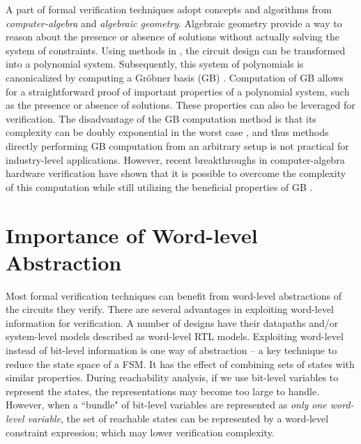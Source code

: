 A part of formal verification techniques adopt concepts and algorithms from 
\emph{computer-algebra} and \emph{algebraic geometry}.
Algebraic geometry provide a way to reason about the presence or absence of solutions 
without actually solving the system of constraints.
Using methods in \cite{Avrunin:CAV,condrat-tacas07,gbverify:2007,jinpeng,pruss:tcad15}, 
the circuit design can be transformed into a polynomial system. Subsequently, this system
of polynomials is canonicalized by computing a Gr\"obner basis (GB) \cite{gb_book}. 
Computation of GB allows for 
a straightforward proof of important properties of a polynomial system, 
such as the presence or absence of 
solutions. These properties can also be leveraged for 
verification. The disadvantage of the GB computation method is that its complexity can be doubly 
exponential in the worst case \cite{dube1986complexity}, and thus methods directly performing GB computation 
from an arbitrary setup is not practical for industry-level applications. However, recent
breakthroughs in computer-algebra hardware verification have shown
that it is possible to overcome the complexity of this computation while
still utilizing the beneficial properties of GB
\cite{lv:phd,tim:phd}.

\section{Importance of Word-level Abstraction}
Most formal verification techniques can benefit from word-level abstractions 
of the circuits they verify.
There are several advantages in exploiting word-level information for
verification. A number of designs have  their
datapaths and/or system-level models described as word-level RTL
models.  Exploiting word-level instead of bit-level information is one
way of abstraction -- a key technique to reduce the state space of a
FSM. It has the effect of combining sets of states with similar 
properties. During reachability analysis, if we use bit-level
variables to  represent the states, the representations may become too
large to handle. However, when a ``bundle" of bit-level variables are
represented as {\it only one word-level variable}, the set of
reachable states can be represented by a  word-level constraint
expression; which may lower verification complexity.


